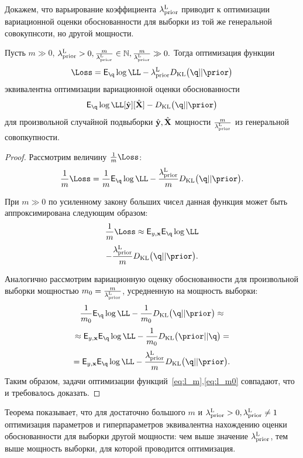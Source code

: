 Докажем, что варьирование коэффициента $\lambda_\text{prior}^\text{L}$ приводит к оптимизации вариационной оценки обоснованности для выборки из той же генеральной совокупнсоти, но другой мощности.
\begin{theorem}
Пусть $m \gg 0$, $\lambda_\text{prior}^\text{L} > 0, \frac{m}{\lambda_\text{prior}^\text{L}}   \in \mathbb{N}, \frac{m}{\lambda_\text{prior}^\text{L}}  \gg 0.$ Тогда оптимизация функции
\[
\Loss = \E_{\q} \log \LL - \lamCL\KL{\q}{\prior}
\]
 эквивалентна оптимизации вариационной оценки обоснованности  $$\E_{\q} \log \LL[\hat{\y}][\hat{\X}] - \KL{\q}{\prior}$$
для произвольной случайной подвыборки $\hat{\mathbf{y}}, \hat{\mathbf{X}}$ мощности $\frac{m}{{\lambda_\text{prior}^\text{L}}}$ из генеральной совопкупности.
\end{theorem}
\label{th:elbo_size}
\begin{proof}
Рассмотрим величину  $\frac{1}{m}\Loss$: \\
\begin{equation}
\label{eq:l_m}
    \frac{1}{m}\Loss = \frac{1}{m}\E_{\q} \log \LL - \frac{\lamCL}{m}\KL{\q}{\prior}.
\end{equation}

При $m \gg 0$ по усиленному закону больших чисел данная функция может быть аппроксимирована следующим образом:
\[
    \frac{1}{m}\Loss \approx  \E_{y,\x} \E_{\q} \log \LL 
\]
\[
-\frac{\lamCL}{m}\KL{\q}{\prior}.
\]

Аналогично рассмотрим вариационную оценку обоснованности для произвольной выборки мощностью $m_0 = \frac{m}{\lambda_\text{prior}^\text{L}}$, усредненную на мощность выборки:
\begin{equation}
\label{eq:l_m0}
    \frac{1}{m_0}\E_{\q} \log \LL - \frac{1}{m_0} \KL{\q}{\prior} \approx
\end{equation}
\[
\approx  \E_{y,\x} \E_{\q} \log \LL  -\frac{1}{m_0}\KL{\prior}{\q}= 
\]
\[
= \E_{y,\x} \E_{\q} \log \LL  -\frac{\lamCL}{m}\KL{\q}{\prior}.
\]
Таким образом, задачи оптимизации функций~\eqref{eq:l_m},\eqref{eq:l_m0} совпадают, что и требовалось доказать.
\end{proof}
Теорема показывает, что для достаточно большого $m$ и $\lambda_\text{prior}^\text{L}>0, \lambda_\text{prior}^\text{L} \neq 1$ оптимизация параметров и гиперпараметров эквивалентна нахождению оценки обоснованности для выборки другой мощности: чем выше значение $ \lambda_\text{prior}^\text{L}$, тем выше мощность выборки, для которой проводится оптимизация.


